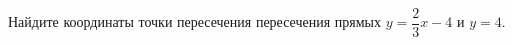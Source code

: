 \begin{ex}
	\begin{condition}
		Найдите координаты точки пересечения пересечения прямых \( y=\dfrac{2}{3}x-4 \) и \( y=4 \).
	\end{condition}
\end{ex}